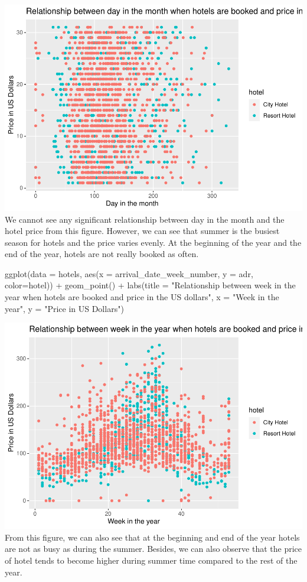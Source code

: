\documentclass[
]{article}
\newenvironment{Shaded}{\begin{snugshade}}{\end{snugshade}}
\newcommand{\AttributeTok}[1]{\textcolor[rgb]{0.77,0.63,0.00}{#1}}
\newcommand{\FunctionTok}[1]{\textcolor[rgb]{0.00,0.00,0.00}{#1}}
\newcommand{\NormalTok}[1]{#1}
\newcommand{\SpecialCharTok}[1]{\textcolor[rgb]{0.00,0.00,0.00}{#1}}
\newcommand{\StringTok}[1]{\textcolor[rgb]{0.31,0.60,0.02}{#1}}
\begin{document}
\includegraphics{written_report_files/figure-latex/unnamed-chunk-7-1.pdf}
We cannot see any significant relationship between day in the month and
the hotel price from this figure. However, we can see that summer is the
busiest season for hotels and the price varies evenly. At the beginning
of the year and the end of the year, hotels are not really booked as
often.

\begin{Shaded}
\begin{Highlighting}[]
\FunctionTok{ggplot}\NormalTok{(}\AttributeTok{data =}\NormalTok{ hotels, }\FunctionTok{aes}\NormalTok{(}\AttributeTok{x =}\NormalTok{ arrival\_date\_week\_number, }\AttributeTok{y =}\NormalTok{ adr, }\AttributeTok{color=}\NormalTok{hotel)) }\SpecialCharTok{+}
\FunctionTok{geom\_point}\NormalTok{() }\SpecialCharTok{+}
\FunctionTok{labs}\NormalTok{(}\AttributeTok{title =} \StringTok{"Relationship between week in the year when hotels are booked and price in the US dollars"}\NormalTok{,}
  \AttributeTok{x =} \StringTok{"Week in the year"}\NormalTok{,}
  \AttributeTok{y =} \StringTok{"Price in US Dollars"}\NormalTok{) }
\end{Highlighting}
\end{Shaded}

\includegraphics{written_report_files/figure-latex/unnamed-chunk-8-1.pdf}
From this figure, we can also see that at the beginning and end of the
year hotels are not as busy as during the summer. Besides, we can also
observe that the price of hotel tends to become higher during summer
time compared to the rest of the year.
\end{document}
